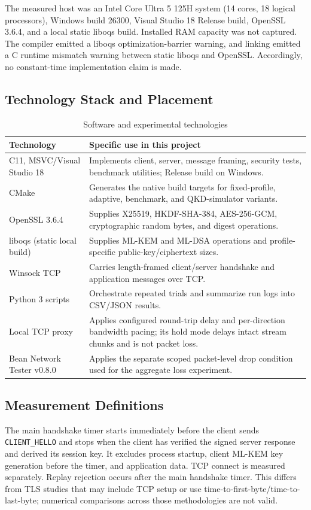 \documentclass[journal]{IEEEtran}
\begin{document}
The measured host was an Intel Core Ultra 5 125H system (14 cores, 18 logical processors), Windows build 26300, Visual Studio 18 Release build, OpenSSL 3.6.4, and a local static liboqs build. Installed RAM capacity was not captured. The compiler emitted a liboqs optimization-barrier warning, and linking emitted a C runtime mismatch warning between static liboqs and OpenSSL. Accordingly, no constant-time implementation claim is made.

\subsection{Technology Stack and Placement}
\begin{table}[t]
\caption{Software and experimental technologies}
\label{tab:technology}
\centering
\footnotesize
\begin{tabular}{p{}p{}}
\toprule
Technology & Specific use in this project \\
\midrule
C11, MSVC/Visual Studio 18 & Implements client, server, message framing, security tests, benchmark utilities; Release build on Windows. \\
CMake & Generates the native build targets for fixed-profile, adaptive, benchmark, and QKD-simulator variants. \\
OpenSSL 3.6.4 & Supplies X25519, HKDF-SHA-384, AES-256-GCM, cryptographic random bytes, and digest operations. \\
liboqs (static local build) & Supplies ML-KEM and ML-DSA operations and profile-specific public-key/ciphertext sizes. \\
Winsock TCP & Carries length-framed client/server handshake and application messages over TCP. \\
Python 3 scripts & Orchestrate repeated trials and summarize run logs into CSV/JSON results. \\
Local TCP proxy & Applies configured round-trip delay and per-direction bandwidth pacing; its hold mode delays intact stream chunks and is not packet loss. \\
Bean Network Tester v0.8.0 & Applies the separate scoped packet-level drop condition used for the aggregate loss experiment. \\
\bottomrule
\end{tabular}
\end{table}

\subsection{Measurement Definitions}
The main handshake timer starts immediately before the client sends \texttt{CLIENT\_HELLO} and stops when the client has verified the signed server response and derived its session key. It excludes process startup, client ML-KEM key generation before the timer, and application data. TCP connect is measured separately. Replay rejection occurs after the main handshake timer. This differs from TLS studies that may include TCP setup or use time-to-first-byte/time-to-last-byte; numerical comparisons across those methodologies are not valid.
\end{document}
